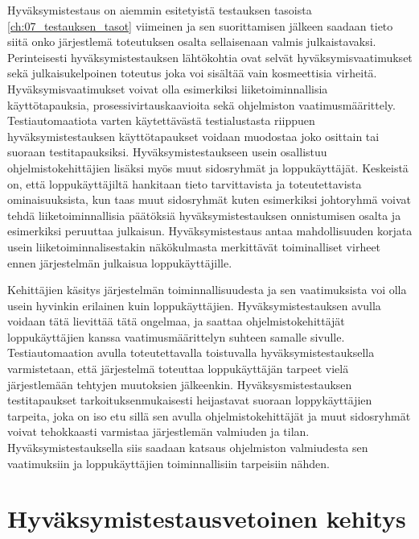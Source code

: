  Hyväksymistestaus on aiemmin esitetyistä testauksen tasoista \ref{ch:07_testauksen_tasot} viimeinen ja sen suorittamisen jälkeen saadaan tieto siitä onko järjestlemä toteutuksen osalta sellaisenaan valmis julkaistavaksi.
  Perinteisesti hyväksymistestauksen lähtökohtia ovat selvät hyväksymisvaatimukset sekä julkaisukelpoinen toteutus joka voi sisältää vain kosmeettisia virheitä.
  Hyväksymisvaatimukset voivat olla esimerkiksi liiketoiminnallisia käyttötapauksia, prosessivirtauskaavioita sekä ohjelmiston vaatimusmäärittely.
  Testiautomaatiota varten käytettävästä testialustasta riippuen hyväksymistestauksen käyttötapaukset voidaan muodostaa joko osittain tai suoraan testitapauksiksi.
  Hyväksymistestaukseen usein osallistuu ohjelmistokehittäjien lisäksi myös muut sidosryhmät ja loppukäyttäjät.
  Keskeistä on, että loppukäyttäjiltä hankitaan tieto tarvittavista ja toteutettavista ominaisuuksista, kun taas muut sidosryhmät kuten esimerkiksi johtoryhmä voivat tehdä liiketoiminnallisia päätöksiä hyväksymistestauksen onnistumisen osalta ja esimerkiksi peruuttaa julkaisun.
  Hyväksymistestaus antaa mahdollisuuden korjata usein liiketoiminnalisestakin näkökulmasta merkittävät toiminalliset virheet ennen järjestelmän julkaisua loppukäyttäjille.

  Kehittäjien käsitys järjestelmän toiminnallisuudesta ja sen vaatimuksista voi olla usein hyvinkin erilainen kuin loppukäyttäjien.
  Hyväksymistestauksen avulla voidaan tätä lievittää tätä ongelmaa, ja saattaa ohjelmistokehittäjät loppukäyttäjien kanssa vaatimusmäärittelyn suhteen samalle sivulle.
  Testiautomaation avulla toteutettavalla toistuvalla hyväksymistestauksella varmistetaan, että järjestelmä toteuttaa loppukäyttäjän tarpeet vielä järjestlemään tehtyjen muutoksien jälkeenkin.
  Hyväksysmistestauksen testitapaukset tarkoituksenmukaisesti heijastavat suoraan loppykäyttäjien tarpeita, joka on iso etu sillä sen avulla ohjelmistokehittäjät ja muut sidosryhmät voivat tehokkaasti varmistaa järjestlemän valmiuden ja tilan.
  Hyväksymistestauksella siis saadaan katsaus ohjelmiston valmiudesta sen vaatimuksiin ja loppukäyttäjien toiminnallisiin tarpeisiin nähden.

\section{Hyväksymistestausvetoinen kehitys} \label{ch:08_hyvaksymistestausvetoinen_kehitys}

